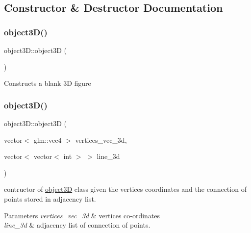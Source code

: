 \subsection{Constructor \& Destructor Documentation}
\mbox{\label{classobject3D_a0911667d0108c1ae15a60a3e120a2a73}} 
\subsubsection{\texorpdfstring{object3\+D()}{object3D()}\hspace{0.1cm}{\footnotesize\ttfamily [1/3]}}
{\footnotesize\ttfamily object3\+D\+::object3D (\begin{DoxyParamCaption}{ }\end{DoxyParamCaption})}

Constructs a blank 3D figure \mbox{\label{classobject3D_a1c60c123d02bd02d9ca35fd507fb81cd}} 
\subsubsection{\texorpdfstring{object3\+D()}{object3D()}\hspace{0.1cm}{\footnotesize\ttfamily [2/3]}}
{\footnotesize\ttfamily object3\+D\+::object3D (\begin{DoxyParamCaption}\item[{vector$<$ glm\+::vec4 $>$}]{vertices\+\_\+vec\+\_\+3d,  }\item[{vector$<$ vector$<$ int $>$ $>$}]{line\+\_\+3d }\end{DoxyParamCaption})}

contructor of \mbox{\hyperlink{classobject3D}{object3D}} class given the vertices coordinates and the connection of points stored in adjacency list. 
\begin{DoxyParams}{Parameters}
{\em vertices\+\_\+vec\+\_\+3d} & vertices co-\/ordinates \\
\hline
{\em line\+\_\+3d} & adjacency list of connection of points. \\
\hline
\end{DoxyParams}
\mbox{\label{classobject3D_a6837b926d352b2fd1aff01bed902f1bf}} 
